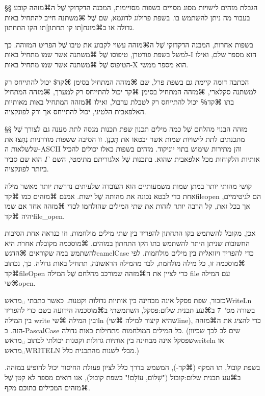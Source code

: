 §§ הגבלת מזהים לישויות מסוג מסויים
בשפות מסויימות, המבנה הדקדוקי שֶׁל ה⌘מזהה קובע בעבור מה ניתן להשתמש בו. בשפת
פרולוג לדוגמא, שם שֶׁל ⌘משתנה חייב להתחיל באות גדולה או ב⌘מונח[תו קו תחתון]{תו
הקו התחתון}.

בשפות אחרות, המבנה הדקדוקי שֶׁל ה⌘מזהה עשוי לקבוע את טיבו שֶׁל הפריט המזוהה. כך
למשל בשפת פורטרן, טיפוסו שֶׁל ⌘משתנה אשר שמו מתחיל באות-I הוא מספר שלם, ואילו
הטיפוס שֶׁל ⌘משתנה אשר שמו מתחיל באות-X הוא מספר ממשי.


הכתבה דומה קיימת גם בשפת פרל, שם ⌘מזהה המתחיל בסימן ⌘קד{\$} יכול להתייחס רק
למשתנה סקלארי, ⌘מזהה המתחיל בסימן ⌘קד{\@} יכול להתייחס רק למערך, ⌘מזהה המתחיל
בתו ⌘קד{％} יכול להתייחס רק לטבלת ערבול, ואילו ⌘מזהה המתחיל באות מאותיות
האלפאבית הלטיני, יכול להתייחס אך ורק לפונקציה.

§§ מזהה הבנוי מהלחם שֶׁל כמה מילים
תכנון שפת תכנות מנסה לתת מענה גם לצורך שֶׁל מתכנתים לתת לישויות שמות אשר יבטאו
את תָּכְנָן. זו הסיבה ששפות מודרניות נִתְּצוּ את שלשלאות ה-ASCII והן מתירות שימוש
בתוי יוניקוד. מזהים בשפות כאלו יכולים להכיל אותיות הלקוחות מכל אלפאבית שהוא.
בתכנות שֶׁל אלגוריתם מתימטי, השם~$Γ$ הוא שם סביר ביותר לפונקציה.

קושי מהותי יותר במתן שמות משמעותיים
הוא העובדה שלעיתים נדרשת יותר מאשר מילה אחת
כדי לבטא נכונה את מהותה שֶׁל ישות. אמנם ⌘מזהים כמו ⌘קד{fileopen}
הם לגיטימיים, אך בכל זאת, קל הרבה יותר לזהות את שתי המילים שהולחמו לכדי ⌘מזהה
אחד אם שמו יהיה ⌘קד{file\_open}.

אכן, מקובל להשתמש בקו התחתון להפריד בין שתי מילים מולחמות, וזו כנראה אחת
הסיבות החשובות שניתן היתר להשתמש בתו הקו התחתון במזהים. ⌘מוסכמה מקובלת אחרת
היא להשתמש במה שקוראים ⌘הדגש{camelCase} כדי להפריד ויזואלית בין מילים מולחמות.
לפי ⌘מוסכמה זו, כל מילה מולחמת, לבד מהמילה הראשונה, תתחיל באות גדולה. כך,
נכתוב ⌘קד{fileOpen} כדי לציין את ה⌘מזהה שמורכב מהלחם שֶׁל המילה {file} עם המילה
⌘שי{open}.

כזכור, שפת פסקל אינה מבחינה בין אותיות גדולות וקטנות. כאשר כתבתי
␣מראש{WriteLn} בשורה מס'~7 ב⌘עע תכנית שלום:פסקל, השתמשתי ב⌘מוסכמה הידועה
בשם  כדי להפריד בין המילה {write} ובין המילה ⌘שי{ln} (שהיא
קיצור למילה ⌘שי{line}), כדי להציג את ה⌘מזהה הזה. ב-{PascalCase} כל המילים
המולחמות מתחילות באות גדולה. (שים לב לכך שכיוון שפסקל אינה מבחינה בין אותיות
גדולות וקטנות יכולתי לכתוב ␣מראש{writeln} או ␣מראש{WRITELN} מבלי
לשנות מהתכנית כלל.)

בשפת קובול, תו המקף (⌘קד{-}), המשמש בדרך כלל לציון פעולת החיסור יכול להופיע
במזהה. ב⌘עע תכנית שלום:קובול ("שָׁלוֹם, עוֹלָם!" בשפת קובול), אנו רואים מספר לא קטן
שֶׁל ⌘מזהים המכילים בתוכם מקף.

